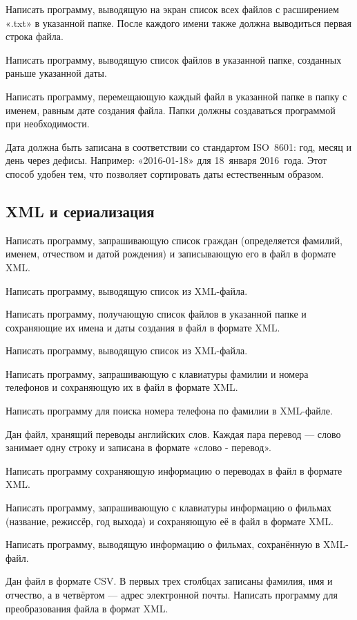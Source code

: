 \task Написать программу, выводящую на экран список всех файлов с
расширением «.txt» в указанной папке. После каждого имени также должна
выводиться первая строка файла.

\task Написать программу, выводящую список файлов в указанной папке,
созданных раньше указанной даты.

\task Написать программу, перемещающую каждый файл в указанной папке в
папку с именем, равным дате создания файла. Папки должны создаваться
программой при необходимости.

Дата должна быть записана в соответствии со стандартом ISO~8601: год,
месяц и день через дефисы. Например: «2016-01-18» для 18~января
2016~года. Этот способ удобен тем, что позволяет сортировать даты
естественным образом.


\subsection{XML и сериализация}

\task Написать программу, запрашивающую список граждан (определяется
фамилий, именем, отчеством и датой рождения) и записывающую его в
файл в формате XML.

Написать программу, выводящую список из XML-файла.

\task Написать программу, получающую список файлов в указанной папке и
сохраняющие их имена и даты создания в файл в формате XML.

Написать программу, выводящую список из XML-файла.

\task Написать программу, запрашивающую с клавиатуры фамилии и номера
телефонов и сохраняющую их в файл в формате XML.

Написать программу для поиска номера телефона по фамилии в XML-файле.

\task Дан файл, хранящий переводы английских слов. Каждая пара перевод
— слово занимает одну строку и записана в формате «слово - перевод».

Написать программу сохраняющую информацию о переводах в файл в формате
XML.

\task Написать программу, запрашивающую с клавиатуры информацию о
фильмах (название, режиссёр, год выхода) и сохраняющую её в файл в
формате XML.

Написать программу, выводящую информацию о фильмах, сохранённую в
XML-файл.

\task Дан файл в формате CSV. В первых трех столбцах записаны фамилия,
имя и отчество, а в четвёртом — адрес электронной почты. Написать
программу для преобразования файла в формат XML.

